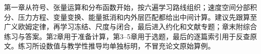 \documentclass[UTF8,a4paper,11pt,openany,fontset=fandol]{ctexbook}
\begin{document}
第一章从符号、张量运算和分布函数开始，按六遍学习路线组织；速度空间分部积分、压力方程、变量变换、能量抵消和内外层匹配都给出中间计算。建议先跟算至广义欧姆定律，再学习冻结、尺度与闭合，最后进入约化和文献专题；章末附综合练习与答案。第2章用于准备计算，第3--5章用于选题，最后的逐篇索引用于反查原文。练习所设数值与教学性推导均单独标明，不冒充论文原始算例。
\tableofcontents
\mainmatter















\backmatter


\end{document}
